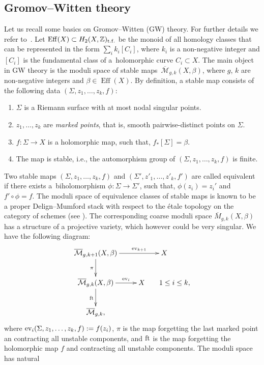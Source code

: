 \documentclass[pdftex]{sigma}
\numberwithin{equation}{section}
\newcommand{\ZZ}{\mathbb{Z}}
\newcommand{\M}{\mathcal{M}}
\begin{document}
\subsection{Gromov--Witten theory}\label{sec:GW}
Let us recall some basics on Gromov--Witten (GW) theory. For
further details we refer to~\cite{Ma}. Let
$\operatorname{Eff}(X)\subset H_2(X,\ZZ)_{\rm t.f.}$ be the monoid of all homology
classes that can be represented in the form $\sum_i k_i [C_i]$, where
$k_i$ is a non-negative integer and $[C_i]$ is the fundamental class
of a~holomorphic curve $C_i\subset X$. The
main object in GW theory is the moduli space of stable maps~$\overline{\M}_{g,k}(X,\beta)$, where $g$, $k$ are non-negative integers
and $\beta\in \operatorname{Eff}(X)$. By definition, a stable map
consists of the following data $(\Sigma, z_1,\dots,z_k, f)$:
\begin{enumerate}\itemsep=0pt
\item[(1)]
 $\Sigma$ is a Riemann surface with at most nodal
 singular points.
\item[(2)]
 $z_1,\dots,z_k$ are {\em marked points}, that is, smooth
 pairwise-distinct points on $\Sigma$.
\item[(3)]
 $f\colon \Sigma \to X$ is a holomorphic map, such that, $f_*[\Sigma]=\beta$.
\item[(4)]
 The map is stable, i.e., the automorphism group of
 $(\Sigma,z_1,\dots,z_k,f)$ is finite.
\end{enumerate}
Two stable maps $(\Sigma,z_1,\dots,z_k,f)$ and
$(\Sigma',z'_1,\dots,z'_k,f')$ are called equivalent if there exists a~biholomorphism $\phi\colon\Sigma\to \Sigma'$, such that, $\phi(z_i)=z_i'$
and $f'\circ \phi = f$. The moduli space of equivalence classes of
stable maps is known to be a proper
Delign--Mumford stack with respect to the \'etale topology on the
category of schemes (see \cite{BeMa}). The corresponding coarse moduli space
$\overline{M}_{g,k}(X,\beta)$ has a structure of a projective variety,
which however could be very singular. We have the following diagram:
\[
\xymatrix{
 \overline{\M}_{g,k+1} (X,\beta) \ar[r]^-{{\rm ev}_{k+1}} \ar[d]_\pi & X \\
 \overline{\M}_{g,k} (X,\beta) \ar[r]^-{{\rm ev}_{i} } \ar[d]_{{\rm
 ft}} & X \qquad 1\leq i\leq k,\\
 \overline{\M}_{g,k}, &
}
\]
where ${\rm ev}_i(\Sigma,z_1,\dots,z_k,f) := f(z_i)$, $\pi$ is the map
forgetting the last marked point an contracting all unstable
components, and ${\rm ft}$ is the map forgetting the holomorphic map
$f$ and contracting all unstable components. The moduli space has natural
\end{document}
